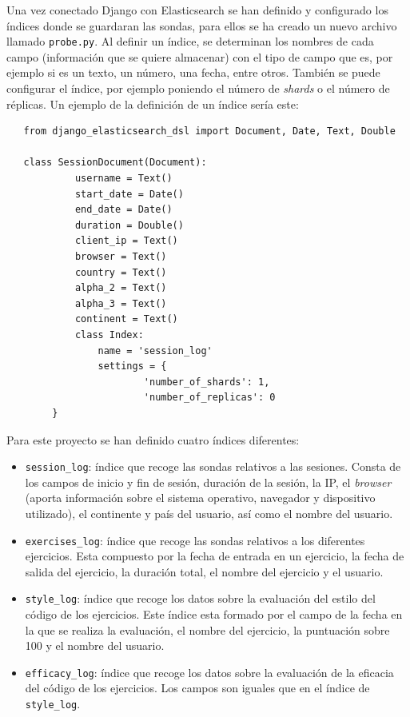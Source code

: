 Una vez conectado Django con Elasticsearch se han definido y configurado los índices donde se guardaran las sondas, para ellos se ha creado un nuevo archivo llamado \texttt{probe.py}. Al definir un índice, se determinan los nombres de cada campo (información que se quiere almacenar) con el tipo de campo que es, por ejemplo si es un texto, un número, una fecha, entre otros. También se puede configurar el índice, por ejemplo poniendo el número de\textit{ shards }o el número de réplicas. Un ejemplo de la definición de un índice sería este: 

\begin{lstlisting}
   from django_elasticsearch_dsl import Document, Date, Text, Double
   
   class SessionDocument(Document):
    		username = Text()
  	  		start_date = Date()
   			end_date = Date()
    		duration = Double()
    		client_ip = Text()
    		browser = Text()
    		country = Text()
    		alpha_2 = Text()
    		alpha_3 = Text()
    		continent = Text()
    		class Index:
        		name = 'session_log'
        		settings = {
            			'number_of_shards': 1,
           				'number_of_replicas': 0
        }
\end{lstlisting} 

Para este proyecto se han definido cuatro índices diferentes:

\begin{itemize}
\item \texttt{session\_log}: índice que recoge las sondas relativos a las sesiones. Consta de los campos de inicio y fin de sesión, duración de la sesión, la IP, el \textit{browser} (aporta información sobre el sistema operativo, navegador y dispositivo utilizado), el continente y país del usuario, así como el nombre del usuario.
\item \texttt{exercises\_log}: índice que recoge las sondas relativos a los diferentes ejercicios. Esta compuesto por la fecha de entrada en un ejercicio, la fecha de salida del ejercicio, la duración total, el nombre del ejercicio y el usuario.
\item \texttt{style\_log}: índice que recoge los datos sobre la evaluación del estilo del código de los ejercicios. Este índice esta formado por el campo de la fecha en la que se realiza la evaluación, el nombre del ejercicio, la puntuación sobre 100 y el nombre del usuario.
\item \texttt{efficacy\_log}: índice que recoge los datos sobre la evaluación de la eficacia del código de los ejercicios. Los campos son iguales que en el índice de \texttt{style\_log}.
\end{itemize}

